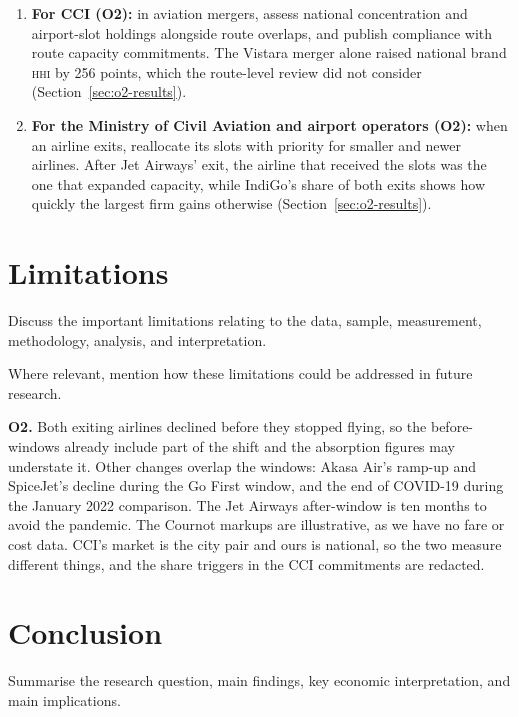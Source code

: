 \documentclass[12pt,a4paper]{article}
\newcommand{\HHI}{\textnormal{\textsc{hhi}}}
\newenvironment{mycontribution}{\par\color{blue}\captionsetup{font+={color=blue}}}{\par}
\begin{document}
\begin{mycontribution}
\begin{enumerate}[leftmargin=2em]
	\item \textbf{For CCI (O2):} in aviation mergers, assess national concentration and airport-slot holdings alongside route overlaps, and publish compliance with route capacity commitments. The Vistara merger alone raised national brand \HHI{} by 256 points, which the route-level review did not consider (Section~\ref{sec:o2-results}).
	\item \textbf{For the Ministry of Civil Aviation and airport operators (O2):} when an airline exits, reallocate its slots with priority for smaller and newer airlines. After Jet Airways' exit, the airline that received the slots was the one that expanded capacity, while IndiGo's share of both exits shows how quickly the largest firm gains otherwise (Section~\ref{sec:o2-results}).
\end{enumerate}
\end{mycontribution}

\section{Limitations}
Discuss the important limitations relating to the data, sample, measurement, methodology, analysis, and interpretation.

Where relevant, mention how these limitations could be addressed in future research.

\begin{mycontribution}
\textbf{O2.} Both exiting airlines declined before they stopped flying, so the before-windows already include part of the shift and the absorption figures may understate it. Other changes overlap the windows: Akasa Air's ramp-up and SpiceJet's decline during the Go First window, and the end of COVID-19 during the January 2022 comparison. The Jet Airways after-window is ten months to avoid the pandemic. The Cournot markups are illustrative, as we have no fare or cost data. CCI's market is the city pair and ours is national, so the two measure different things, and the share triggers in the CCI commitments are redacted.
\end{mycontribution}

\section{Conclusion}
Summarise the research question, main findings, key economic interpretation, and main implications.
\end{document}

